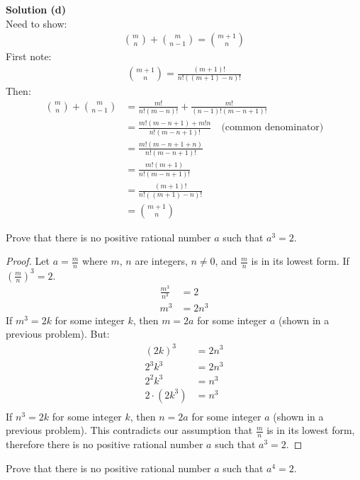 \documentclass[6pt]{article}
\begin{document}
\textbf{Solution (d)} \\
Need to show:
\begin{align*}
\binom{m}{n} + \binom{m}{n - 1} = \binom{m + 1}{n}
\end{align*}
First note: \\
\begin{align*}
\binom{m + 1}{n} = \frac{(m + 1)!}{n!((m + 1) - n)!}
\end{align*}
Then:
\begin{align*}
\binom{m}{n} + \binom{m}{n - 1}
&= \frac{m!}{n!(m - n)!} + \frac{m!}{(n - 1)!(m - n + 1)!} \\
&= \frac{m!(m - n + 1) + m!n}{n!(m - n + 1)!} \quad \text{(common denominator)} \\
&= \frac{m!(m - n + 1 + n)}{n!(m - n + 1)!} \\
&= \frac{m!(m + 1)}{n!(m - n + 1)!} \\
&= \frac{(m + 1)!}{n!((m + 1) - n)!} \\
&= \binom{m + 1}{n}
\end{align*}


\begin{tcolorbox}[title=Problem 8, breakable]
Prove that there is no positive rational number $a$ such that $a^3 = 2$.
\end{tcolorbox}

\begin{proof} Let $a = \frac{m}{n}$ where $m$, $n$ are integers, $n \not = 0$, and $\frac{m}{n}$
is in its lowest form. If ${(\frac{m}{n})}^3 = 2$.
\begin{align*}
\frac{m^3}{n^3} &= 2 \\
m^3 &= 2n^3 
\end{align*}
If $m^3 = 2k$ for some integer $k$, then $m = 2a$ for some integer $a$ (shown in a previous problem). 
But:
\begin{align*}
{(2k)}^3 &= 2n^3 \\
2^3k^3 &= 2n^3 \\
2^2k^3 &= n^3 \\
2 \cdot (2k^3) &= n^3 \\
\end{align*}
If $n^3 = 2k$ for some integer $k$, then $n = 2a$ for some integer $a$ (shown in a previous problem). 
This contradicts our assumption that $\frac{m}{n}$ is in its lowest form, therefore
there is no positive rational number $a$ such that $a^3 = 2$.
\end{proof}


\begin{tcolorbox}[title=Problem 9, breakable]
Prove that there is no positive rational number $a$ such that $a^4 = 2$.
\end{tcolorbox}
\end{document}
